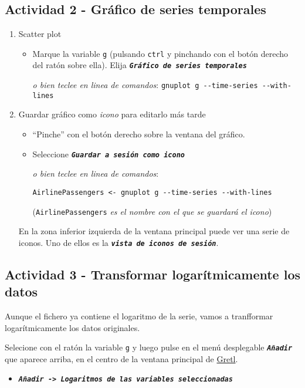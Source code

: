 \documentclass[11pt]{article}
\begin{document}
\subsection{Actividad 2 - Gráfico de series temporales}
\label{sec:org059848e}
\begin{enumerate}
\item Scatter plot
\label{sec:org0e0d6f5}
\begin{itemize}
\item Marque la variable \texttt{g} (pulsando \texttt{ctrl} y pinchando con el botón
derecho del ratón sobre ella). Elija \textbf{\emph{\texttt{Gráfico de series temporales}}}

{\vspace{1pt} \footnotesize \color{gray!70!black}
\emph{o bien teclee en linea de comandos}: \texttt{gnuplot g -{}-time-series -{}-with-lines}
}
\end{itemize}

\item Guardar gráfico como \emph{icono} para editarlo más tarde
\label{sec:org03e1df3}
\begin{itemize}
\item ``Pinche'' con el botón derecho sobre la ventana del gráfico.
\item Seleccione \textbf{\emph{\texttt{Guardar a sesión como icono}}}

{\vspace{1pt} \footnotesize \color{gray!70!black} \color{gray!70!black}
\emph{o bien teclee en linea de comandos}:
\begin{verbatim}
AirlinePassengers <- gnuplot g --time-series --with-lines
\end{verbatim}
(\texttt{AirlinePassengers} \emph{es el nombre con el que se guardará el icono})
}
\end{itemize}

En la zona inferior izquierda de la ventana principal puede ver una
serie de iconos. Uno de ellos es la \textbf{\emph{\texttt{vista de iconos de sesión}}}.
\end{enumerate}


\subsection{Actividad 3 - Transformar logarítmicamente los datos}
\label{sec:orgc63b462}
Aunque el fichero ya contiene el logaritmo de la serie, vamos a
tranfformar logarítmicamente los datos originales.

Selecione con el ratón la variable \texttt{g} y luego pulse en el menú desplegable \textbf{\emph{\texttt{Añadir}}} que aparece arriba, en el centro de la
ventana principal de \href{https://gretl.sourceforge.net/es.html}{Gretl}.
\begin{itemize}
\item \textbf{\emph{\texttt{Añadir -> Logaritmos de las variables seleccionadas}}}
\end{itemize}
\end{document}
